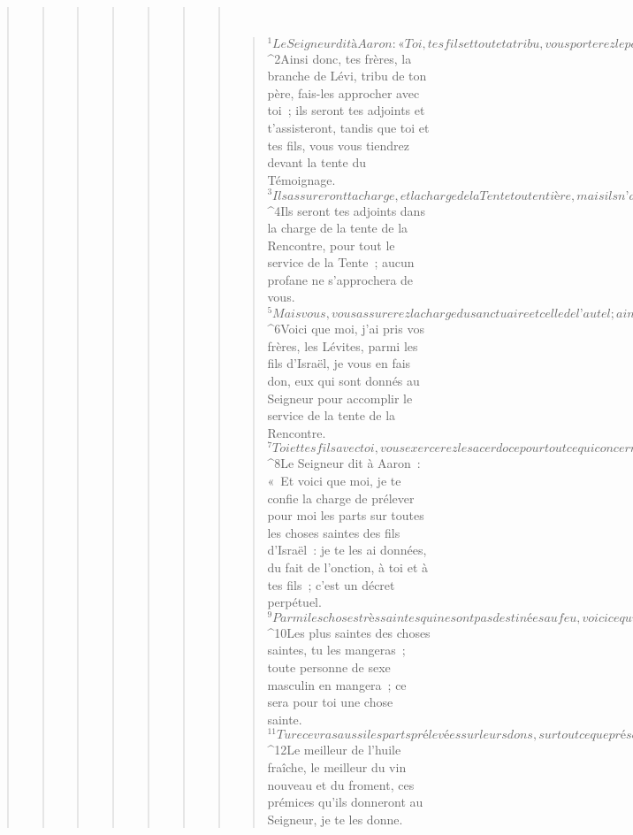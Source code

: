 \begin{verse}
\begin{verse}
\begin{verse}
\begin{verse}
\begin{verse}
\begin{verse}
\begin{verse}
         
      \bchapter{}
      \begin{verse}
${}^{1}Le Seigneur dit à Aaron : « Toi, tes fils et toute ta tribu, vous porterez le poids des fautes commises envers le sanctuaire ; mais seuls, toi et tes fils avec toi, vous porterez le poids des fautes commises dans l’exercice de votre sacerdoce. 
${}^{2}Ainsi donc, tes frères, la branche de Lévi, tribu de ton père, fais-les approcher avec toi ; ils seront tes adjoints et t’assisteront, tandis que toi et tes fils, vous vous tiendrez devant la tente du Témoignage. 
${}^{3}Ils assureront ta charge, et la charge de la Tente tout entière, mais ils n’approcheront pas des objets du sanctuaire ni de l’autel, de peur qu’ils ne meurent, eux et vous avec eux. 
${}^{4}Ils seront tes adjoints dans la charge de la tente de la Rencontre, pour tout le service de la Tente ; aucun profane ne s’approchera de vous. 
${}^{5}Mais vous, vous assurerez la charge du sanctuaire et celle de l’autel ; ainsi il n’y aura plus de colère contre les fils d’Israël. 
${}^{6}Voici que moi, j’ai pris vos frères, les Lévites, parmi les fils d’Israël, je vous en fais don, eux qui sont donnés au Seigneur pour accomplir le service de la tente de la Rencontre. 
${}^{7}Toi et tes fils avec toi, vous exercerez le sacerdoce pour tout ce qui concerne l’autel et ce qui est derrière le rideau ; ce sera votre service. Je vous donne le sacerdoce comme on donne un service. Le profane qui s’approchera sera mis à mort. »
${}^{8}Le Seigneur dit à Aaron : « Et voici que moi, je te confie la charge de prélever pour moi les parts sur toutes les choses saintes des fils d’Israël : je te les ai données, du fait de l’onction, à toi et à tes fils ; c’est un décret perpétuel. 
${}^{9}Parmi les choses très saintes qui ne sont pas destinées au feu, voici ce qui sera pour toi : tous les présents réservés que me rapportent les fils d’Israël, à savoir l’offrande de céréales, le sacrifice pour la faute et le sacrifice de réparation ; ce sont là, pour toi et tes fils, les plus saintes des choses saintes. 
${}^{10}Les plus saintes des choses saintes, tu les mangeras ; toute personne de sexe masculin en mangera ; ce sera pour toi une chose sainte.
${}^{11}Tu recevras aussi les parts prélevées sur leurs dons, sur tout ce que présentent les fils d’Israël avec le geste d’élévation. Je te les donne, à toi ainsi qu’à tes fils et tes filles ; c’est un décret perpétuel ; quiconque, dans ta maison, sera en état de pureté en mangera. 
${}^{12}Le meilleur de l’huile fraîche, le meilleur du vin nouveau et du froment, ces prémices qu’ils donneront au Seigneur, je te les donne. 

\end{verse}
\end{verse}
\end{verse}
\end{verse}
\end{verse}
\end{verse}
\end{verse}
\end{verse}
